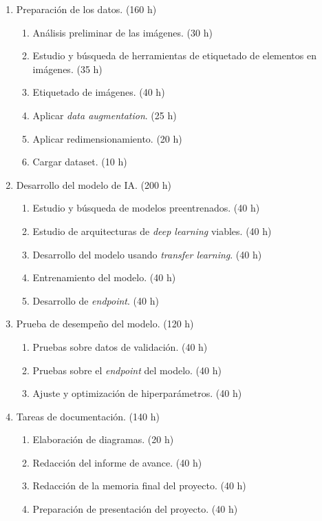 \documentclass[
11pt, %
]{charter}
\begin{document}
\begin{enumerate}
\item Preparación de los datos. (160 h)
	\begin{enumerate}
	\item Análisis preliminar de las imágenes. (30 h)
	\item Estudio y búsqueda de herramientas de etiquetado de elementos en imágenes. (35 h)
	\item Etiquetado de imágenes. (40 h)
	\item Aplicar \textit{data augmentation}. (25 h)
	\item Aplicar redimensionamiento. (20 h)
	\item Cargar dataset. (10 h)
	\end{enumerate}
\item Desarrollo del modelo de IA. (200 h)
	\begin{enumerate}
	\item Estudio y búsqueda de modelos preentrenados. (40 h)
	\item Estudio de arquitecturas de \textit{deep learning} viables. (40 h)
	\item Desarrollo del modelo usando \textit{transfer learning}. (40 h)
	\item Entrenamiento del modelo. (40 h)
	\item Desarrollo de \textit{endpoint}. (40 h)
	\end{enumerate}
\item Prueba de desempeño del modelo. (120 h)
	\begin{enumerate}
	\item Pruebas sobre datos de validación.  (40 h)
	\item Pruebas sobre el \textit{endpoint} del modelo. (40 h)
	\item Ajuste y optimización de hiperparámetros. (40 h)
	\end{enumerate}
\item Tareas de documentación. (140 h)
	\begin{enumerate}
	\item Elaboración de diagramas. (20 h)
	\item Redacción del informe de avance. (40 h)
	\item Redacción de la memoria final del proyecto. (40 h)
	\item Preparación de presentación del proyecto. (40 h)
	\end{enumerate}
\end{enumerate}
\end{document}
